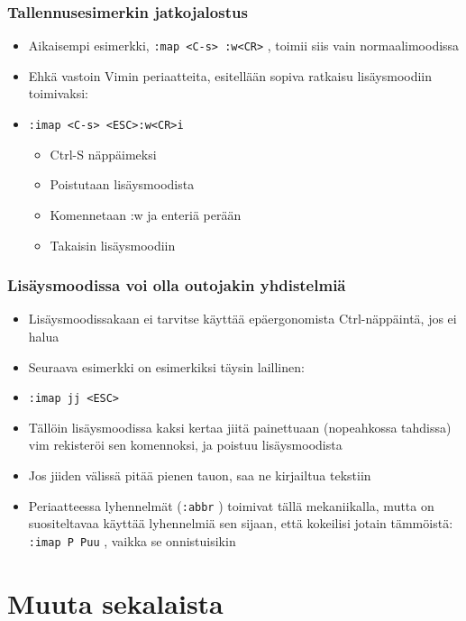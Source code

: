 \documentclass[]{beamer}
\newcommand{\Tohj}[1]{\texttt{#1}}
\newcommand{\com}[1]{{\color{blue!50!black}\Tohj{#1}} \!\!}
\begin{document}
\begin{frame}
    \frametitle{Tallennusesimerkin jatkojalostus}
    \begin{itemize}
        \item Aikaisempi esimerkki, \com{:map <C-s> :w<CR>}, toimii siis vain normaalimoodissa
        \pause
        \item Ehkä vastoin Vimin periaatteita, esitellään sopiva ratkaisu lisäysmoodiin toimivaksi:
        \item \com{:imap \alert<3>{<C-s>} \alert<4>{<ESC>}\alert<5>{:w<CR>}\alert<6>{i}} 
        \pause
        \begin{itemize}
            \item<+-| alert@+> Ctrl-S näppäimeksi
            \item<+-| alert@+> Poistutaan lisäysmoodista
            \item<+-| alert@+> Komennetaan :w ja enteriä perään
            \item<+-| alert@+> Takaisin lisäysmoodiin
        \end{itemize}
    \end{itemize}
\end{frame}

\begin{frame}
    \frametitle{Lisäysmoodissa voi olla outojakin yhdistelmiä}
    \begin{itemize}
        \item Lisäysmoodissakaan ei tarvitse käyttää epäergonomista Ctrl-näppäintä, jos ei halua
        \item Seuraava esimerkki on esimerkiksi täysin laillinen: 
        \item \com{:imap jj <ESC>} 
        \pause
        \item Tällöin lisäysmoodissa kaksi kertaa jiitä painettuaan (nopeahkossa tahdissa) vim rekisteröi sen komennoksi, ja poistuu lisäysmoodista
        \item Jos jiiden välissä pitää pienen tauon, saa ne kirjailtua tekstiin
        \pause
        \item Periaatteessa lyhennelmät (\com{:abbr}) toimivat tällä mekaniikalla, mutta on suositeltavaa käyttää lyhennelmiä sen sijaan, että kokeilisi jotain tämmöistä: \com{:imap P Puu}, vaikka se onnistuisikin
    \end{itemize}
\end{frame}

\section{Muuta sekalaista}
\end{document}

